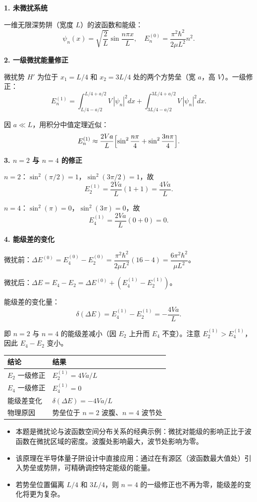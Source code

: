 \begin{derivationbox}[标准解题过程]
\textbf{1. 未微扰系统}

一维无限深势阱（宽度 $L$）的波函数和能级：
\[
\psi_n(x)=\sqrt{\frac{2}{L}}\sin\frac{n\pi x}{L},\quad E_n^{(0)}=\frac{\pi^2\hbar^2}{2\mu L^2}n^2.
\]

\textbf{2. 一级微扰能量修正}

微扰势 $H'$ 为位于 $x_1=L/4$ 和 $x_2=3L/4$ 处的两个方势垒（宽 $a$，高 $V$）。一级修正：
\[
E_n^{(1)}=\int_{L/4-a/2}^{L/4+a/2}\!V\,|\psi_n|^2dx+\int_{3L/4-a/2}^{3L/4+a/2}\!V\,|\psi_n|^2dx.
\]

因 $a\ll L$，用积分中值定理近似：
\[
E_n^{(1)}\approx\frac{2Va}{L}\Bigl[\sin^2\frac{n\pi}{4}+\sin^2\frac{3n\pi}{4}\Bigr].
\]

\textbf{3. $n=2$ 与 $n=4$ 的修正}

\textit{$n=2$}：$\sin^2(\pi/2)=1$，$\sin^2(3\pi/2)=1$，故
\begin{equation}
E_2^{(1)}=\frac{2Va}{L}(1+1)=\frac{4Va}{L}.
\end{equation}

\textit{$n=4$}：$\sin^2(\pi)=0$，$\sin^2(3\pi)=0$，故
\begin{equation}
E_4^{(1)}=\frac{2Va}{L}(0+0)=0.
\end{equation}

\textbf{4. 能级差的变化}

微扰前：$\Delta E^{(0)}=E_4^{(0)}-E_2^{(0)}=\dfrac{\pi^2\hbar^2}{2\mu L^2}(16-4)=\dfrac{6\pi^2\hbar^2}{\mu L^2}$。

微扰后：$\Delta E=E_4-E_2=\Delta E^{(0)}+(E_4^{(1)}-E_2^{(1)})$。

能级差的变化量：
\begin{equation}
\boxed{\delta(\Delta E)=E_4^{(1)}-E_2^{(1)}=-\frac{4Va}{L}.}
\end{equation}

即 $n=2$ 与 $n=4$ 的能级差减小（因 $E_2$ 上升而 $E_4$ 不变）。注意 $E_2^{(1)}>E_4^{(1)}$，因此 $E_4-E_2$ 变小。
\end{derivationbox}

\begin{formulabox}[答案汇总]
\begin{center}
\begin{tabular}{ll}
\toprule
\textbf{结论} & \textbf{结果} \\
\midrule
$E_2$ 一级修正 & $E_2^{(1)}=4Va/L$ \\
$E_4$ 一级修正 & $E_4^{(1)}=0$ \\
能级差变化 & $\delta(\Delta E)=-4Va/L$ \\
物理原因 & 势垒位于 $n=2$ 波腹、$n=4$ 波节处 \\
\bottomrule
\end{tabular}
\end{center}
\end{formulabox}

\begin{insightbox}[物理图像]
\begin{itemize}
    \item 本题是微扰论与波函数空间分布关系的经典示例：微扰对能级的影响正比于波函数在微扰区域的密度。波腹处影响最大，波节处影响为零。
    \item 该原理在半导体量子阱设计中直接应用：通过在有源区（波函数最大值处）引入势垒或势阱，可精确调控特定能级的能量。
    \item 若势垒位置偏离 $L/4$ 和 $3L/4$，则 $n=4$ 的一级修正也不再为零，能级差的变化将更为复杂。
\end{itemize}
\end{insightbox}
